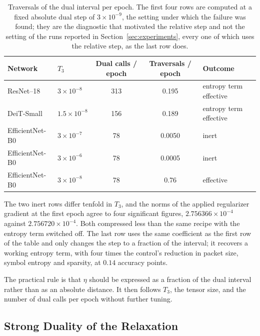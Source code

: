\documentclass{article}
\begin{document}
\begin{table}[ht]
  \caption{Traversals of the dual interval per epoch. The first four rows are
  computed at a fixed absolute dual step of $3\times10^{-9}$, the setting under
  which the failure was found; they are the diagnostic that motivated the relative
  step and not the setting of the runs reported in Section~\ref{sec:experiments},
  every one of which uses the relative step, as the last row does.}
  \label{tab:dual-traversals}
  \centering
  \small
  \setlength{\tabcolsep}{5pt}
  \begin{tabular}{llccl}
    \toprule
    Network & $T_3$ & Dual calls / epoch & Traversals / epoch & Outcome \\
    \midrule
    ResNet--18 & $3\!\times\!10^{-8}$ & 313 & 0.195 & entropy term effective \\
    DeiT-Small & $1.5\!\times\!10^{-8}$ & 156 & 0.189 & entropy term effective \\
    EfficientNet-B0 & $3\!\times\!10^{-7}$ & 78 & 0.0050 & inert \\
    EfficientNet-B0 & $3\!\times\!10^{-6}$ & 78 & 0.0005 & inert \\
    EfficientNet-B0 & $3\!\times\!10^{-8}$ & 78 & 0.76 & effective \\
    \bottomrule
  \end{tabular}
\end{table}

The two inert rows differ tenfold in $T_3$, and the norms of the applied
regularizer gradient at the first epoch agree to four significant figures,
$2.756366\times10^{-4}$ against $2.756720\times10^{-4}$. Both compressed less
than the same recipe with the entropy term switched off. The last row uses the
same coefficient as the first row of the table and only changes the step to a
fraction of the interval; it recovers a working entropy term, with four times
the control's reduction in packet size, symbol entropy and sparsity, at $0.14$
accuracy points.

The practical rule is that $\eta$ should be expressed as a fraction of the
dual interval rather than as an absolute distance. It then follows $T_3$, the
tensor size, and the number of dual calls per epoch without further tuning.


\subsection{Strong Duality of the Relaxation}
\label{app:strong-duality}
\end{document}

